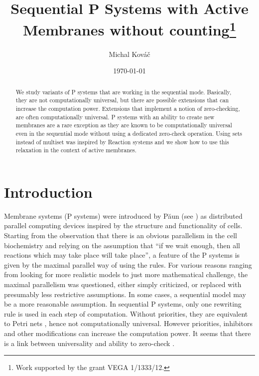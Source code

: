 \documentclass[llncs,submission,copyright,creativecommons]{../lib/lncs/llncs}
\begin{document}
\title{Sequential P Systems with Active Membranes without counting\thanks{Work supported by the grant VEGA 1/1333/12.}}
\author{Michal Kováč}
\date{\today}
\maketitle

\begin{abstract}
We study variants of P systems that are working in the sequential mode. Basically, they are not computationally universal, but there are possible extensions that can increase the computation power. Extensions that implement a notion of zero-checking, are often computationally universal.
P systems with an ability to create new membranes are a rare exception as they are known to be computationally universal even in the sequential mode without using a dedicated zero-check operation. Using sets instead of multiset was inspired by Reaction systems and we show how to use this relaxation in the context of active membranes.
\end{abstract}

\section{Introduction}
\label{sec:introduction}


Membrane systems (P systems) \cite{Paun10OxfordHandbookMembraneComputing} were introduced by P\u{a}un (see \cite{Paun2000108}) as distributed parallel computing devices inspired by the structure and functionality of cells. Starting from the observation that there is an obvious parallelism in the cell biochemistry and relying on the assumption that ``if we wait enough, then all reactions which may take place will take place'', a feature of the P systems is given by the maximal parallel way of using the rules. For various reasons ranging from looking for more realistic models to just more mathematical challenge, the maximal parallelism was questioned, either simply criticized, or replaced with presumably less restrictive assumptions.
In some cases, a sequential model may be a more reasonable assumption. In sequential P systems, only one rewriting rule is used in each step of computation. Without priorities, they are equivalent to Petri nets \cite{Ibarra05Active}, hence not computationally universal. However priorities, inhibitors and other modifications can increase the computation power. It seems that there is a link between universality and ability to zero-check \cite{Alhazov12Properties}.
\end{document}
